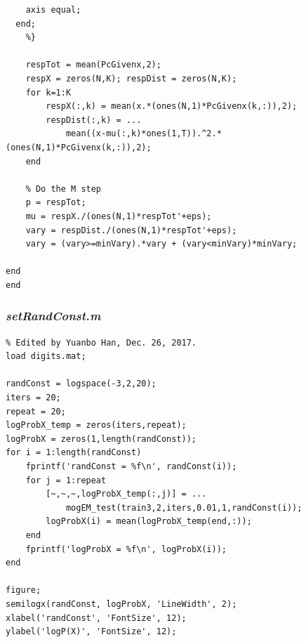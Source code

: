 \documentclass{article}
\begin{document}
\begin{lstlisting}
    axis equal;
  end;
    %}
    
    respTot = mean(PcGivenx,2);
    respX = zeros(N,K); respDist = zeros(N,K);
    for k=1:K
        respX(:,k) = mean(x.*(ones(N,1)*PcGivenx(k,:)),2);
        respDist(:,k) = ...
            mean((x-mu(:,k)*ones(1,T)).^2.*(ones(N,1)*PcGivenx(k,:)),2);
    end
    
    % Do the M step
    p = respTot;
    mu = respX./(ones(N,1)*respTot'+eps);
    vary = respDist./(ones(N,1)*respTot'+eps);
    vary = (vary>=minVary).*vary + (vary<minVary)*minVary;
    
end
end

\end{lstlisting}

\subsubsection{\emph{setRandConst.m}}
\begin{lstlisting}
% Edited by Yuanbo Han, Dec. 26, 2017.
load digits.mat;

randConst = logspace(-3,2,20);
iters = 20;
repeat = 20;
logProbX_temp = zeros(iters,repeat);
logProbX = zeros(1,length(randConst));
for i = 1:length(randConst)
    fprintf('randConst = %f\n', randConst(i));
    for j = 1:repeat
        [~,~,~,logProbX_temp(:,j)] = ...
            mogEM_test(train3,2,iters,0.01,1,randConst(i));
        logProbX(i) = mean(logProbX_temp(end,:));
    end
    fprintf('logProbX = %f\n', logProbX(i));
end

figure;
semilogx(randConst, logProbX, 'LineWidth', 2);
xlabel('randConst', 'FontSize', 12);
ylabel('logP(X)', 'FontSize', 12);

\end{lstlisting}
\end{document}
